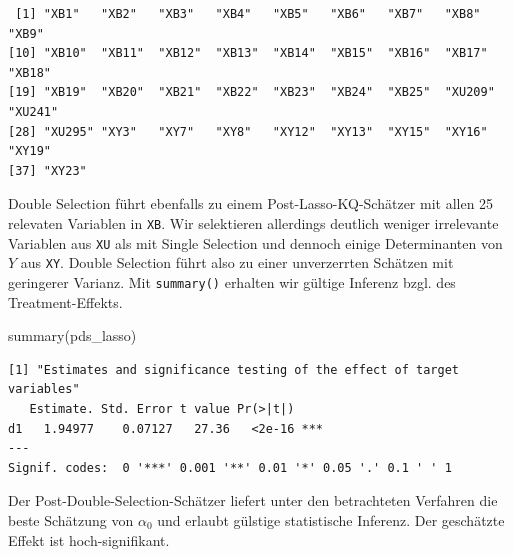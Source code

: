 \documentclass[
  a4paper,
  DIV=11,
  oneside]{scrreprt}
\newenvironment{Shaded}{\begin{snugshade}}{\end{snugshade}}
\newcommand{\FunctionTok}[1]{\textcolor[rgb]{0.28,0.35,0.67}{#1}}
\newcommand{\NormalTok}[1]{\textcolor[rgb]{0.00,0.23,0.31}{#1}}
\begin{document}
\begin{verbatim}
 [1] "XB1"   "XB2"   "XB3"   "XB4"   "XB5"   "XB6"   "XB7"   "XB8"   "XB9"  
[10] "XB10"  "XB11"  "XB12"  "XB13"  "XB14"  "XB15"  "XB16"  "XB17"  "XB18" 
[19] "XB19"  "XB20"  "XB21"  "XB22"  "XB23"  "XB24"  "XB25"  "XU209" "XU241"
[28] "XU295" "XY3"   "XY7"   "XY8"   "XY12"  "XY13"  "XY15"  "XY16"  "XY19" 
[37] "XY23" 
\end{verbatim}

Double Selection führt ebenfalls zu einem Post-Lasso-KQ-Schätzer mit
allen 25 relevaten Variablen in \texttt{XB}. Wir selektieren allerdings
deutlich weniger irrelevante Variablen aus \texttt{XU} als mit Single
Selection und dennoch einige Determinanten von \(Y\) aus \texttt{XY}.
Double Selection führt also zu einer unverzerrten Schätzen mit
geringerer Varianz. Mit \texttt{summary()} erhalten wir gültige Inferenz
bzgl. des Treatment-Effekts.

\begin{Shaded}
\begin{Highlighting}[]
\FunctionTok{summary}\NormalTok{(pds\_lasso)}
\end{Highlighting}
\end{Shaded}

\begin{verbatim}
[1] "Estimates and significance testing of the effect of target variables"
   Estimate. Std. Error t value Pr(>|t|)    
d1   1.94977    0.07127   27.36   <2e-16 ***
---
Signif. codes:  0 '***' 0.001 '**' 0.01 '*' 0.05 '.' 0.1 ' ' 1
\end{verbatim}

Der Post-Double-Selection-Schätzer liefert unter den betrachteten
Verfahren die beste Schätzung von \(\alpha_0\) und erlaubt gülstige
statistische Inferenz. Der geschätzte Effekt ist hoch-signifikant.
\end{document}
